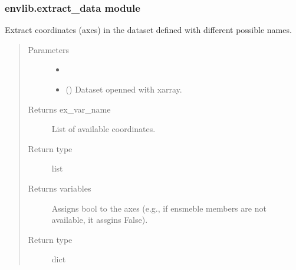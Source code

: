 \documentclass[a4paper,11pt,english]{sphinxmanual}
\begin{document}
\subsubsection{envlib.extract\_data module}
\label{\detokenize{envlib:module-envlib.extract_data}}\label{\detokenize{envlib:envlib-extract-data-module}}

\begin{fulllineitems}
\label{\detokenize{envlib:envlib.extract_data.extract_coordinates}}
Extract coordinates (axes) in the dataset defined with different possible names.
\begin{quote}\begin{description}
\item[{Parameters}] \leavevmode\begin{itemize}
\item {} 
 \textendash{} 

\item {} 
 () \textendash{} Dataset openned with xarray.

\end{itemize}

\item[{Returns ex\_var\_name}] \leavevmode
List of available coordinates.

\item[{Return type}] \leavevmode
list

\item[{Returns variables}] \leavevmode
Assigns bool to the axes (e.g., if ensmeble members are not available, it assgins False).

\item[{Return type}] \leavevmode
dict

\end{description}\end{quote}

\end{fulllineitems}
\end{document}
